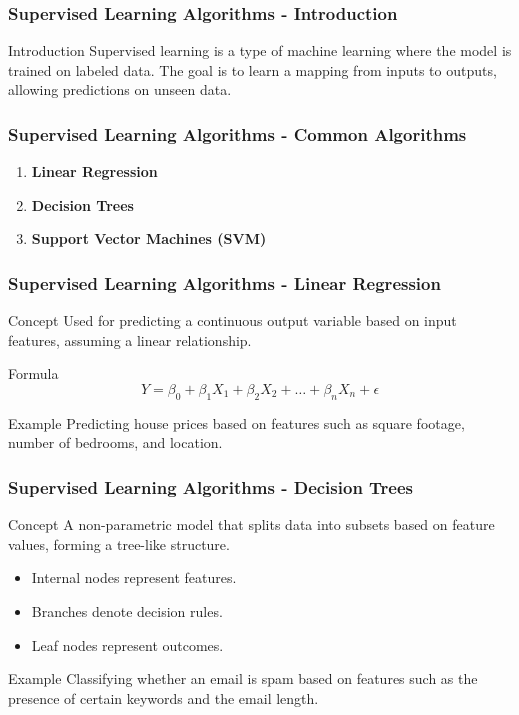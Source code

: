 \documentclass[aspectratio=169]{beamer}
\begin{document}
\begin{frame}[fragile]
    \frametitle{Supervised Learning Algorithms - Introduction}
    \begin{block}{Introduction}
        Supervised learning is a type of machine learning where the model is trained on labeled data. 
        The goal is to learn a mapping from inputs to outputs, allowing predictions on unseen data.
    \end{block}
\end{frame}

\begin{frame}[fragile]
    \frametitle{Supervised Learning Algorithms - Common Algorithms}
    \begin{enumerate}
        \item \textbf{Linear Regression}
        \item \textbf{Decision Trees}
        \item \textbf{Support Vector Machines (SVM)}
    \end{enumerate}
\end{frame}

\begin{frame}[fragile]
    \frametitle{Supervised Learning Algorithms - Linear Regression}
    \begin{block}{Concept}
        Used for predicting a continuous output variable based on input features, assuming a linear relationship.
    \end{block}
    \begin{block}{Formula}
        \begin{equation}
            Y = \beta_0 + \beta_1X_1 + \beta_2X_2 + \ldots + \beta_nX_n + \epsilon
        \end{equation}
    \end{block}
    \begin{block}{Example}
        Predicting house prices based on features such as square footage, number of bedrooms, and location.
    \end{block}
\end{frame}

\begin{frame}[fragile]
    \frametitle{Supervised Learning Algorithms - Decision Trees}
    \begin{block}{Concept}
        A non-parametric model that splits data into subsets based on feature values, forming a tree-like structure.
    \end{block}
    \begin{itemize}
        \item Internal nodes represent features.
        \item Branches denote decision rules.
        \item Leaf nodes represent outcomes.
    \end{itemize}
    \begin{block}{Example}
        Classifying whether an email is spam based on features such as the presence of certain keywords and the email length.
    \end{block}
\end{frame}
\end{document}
